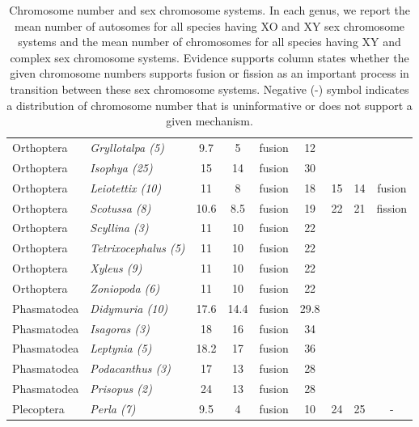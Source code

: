 \documentclass[]{rsos}%
\begin{document}
\begin{table}[ht]
{\begin{tabular}{llccccccc}
Orthoptera           & \textit{Gryllotalpa (5)}     & 9.7  & 5    & fusion & 12   &                &              &         \\
Orthoptera           & \textit{Isophya (25)}        & 15   & 14   & fusion & 30   &                &              &         \\
Orthoptera           & \textit{Leiotettix (10)}     & 11   & 8    & fusion & 18   & 15             & 14           & fusion  \\
Orthoptera           & \textit{Scotussa (8)}        & 10.6 & 8.5  & fusion & 19   & 22             & 21           & fission \\
Orthoptera           & \textit{Scyllina (3)}        & 11   & 10   & fusion & 22   &                &              &         \\
Orthoptera           & \textit{Tetrixocephalus (5)} & 11   & 10   & fusion & 22   &                &              &         \\
Orthoptera           & \textit{Xyleus (9)}          & 11   & 10   & fusion & 22   &                &              &         \\
Orthoptera           & \textit{Zoniopoda (6)}       & 11   & 10   & fusion & 22   &                &              &         \\
Phasmatodea          & \textit{Didymuria (10)}      & 17.6 & 14.4 & fusion & 29.8 &                &              &         \\
Phasmatodea          & \textit{Isagoras (3)}        & 18   & 16   & fusion & 34   &                &              &         \\
Phasmatodea          & \textit{Leptynia (5)}        & 18.2 & 17   & fusion & 36   &                &              &         \\
Phasmatodea          & \textit{Podacanthus (3)}     & 17   & 13   & fusion & 28   &                &              &         \\
Phasmatodea          & \textit{Prisopus (2)}        & 24   & 13   & fusion & 28   &                &              &         \\
Plecoptera           & \textit{Perla (7)}           & 9.5  & 4    & fusion & 10   & 24             & 25           & -       \\ \hline
\end{tabular}%
}
\caption{Chromosome number and sex chromosome systems. In each genus, we report the mean number of autosomes for all species having XO and XY sex chromosome systems and the mean number of chromosomes for all species having XY and complex sex chromosome systems. Evidence supports column states whether the given chromosome numbers supports fusion or fission as an important process in transition between these sex chromosome systems. Negative (-) symbol indicates a distribution of chromosome number that is uninformative or does not support a given mechanism.}
\label{tab:fusions}
\end{table}
\end{document}

